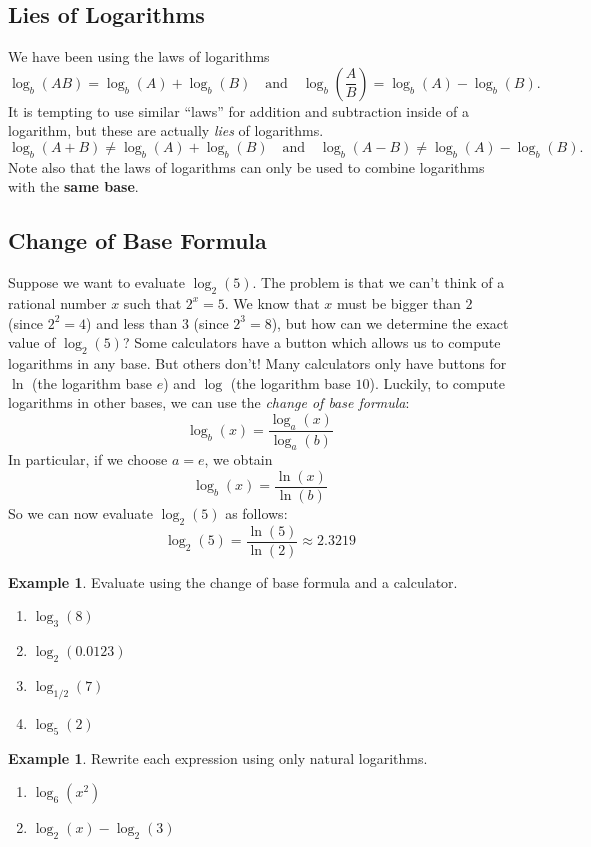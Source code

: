 \documentclass[letterpaper,12pt,oneside]{book}
\theoremstyle{definition}
\newtheorem{example}[theorem]{Example}
\begin{document}
{\subsection*{Lies of Logarithms}

We have been using the laws of logarithms
\[
\log_b(AB)=\log_b(A)+\log_b(B) \ \ \ \mbox{ and } \ \ \ \log_b\left(\frac{A}{B}\right)=\log_b(A)-\log_b(B).
\]
It is tempting to use similar ``laws'' for addition and subtraction inside of a logarithm, but these are actually \emph{lies} of logarithms.
\[
\log_b(A+B)\neq \log_b(A)+\log_b(B) \ \ \ \mbox{ and } \ \ \ \log_b(A-B)\neq \log_b(A)-\log_b(B).
\]
Note also that the laws of logarithms can only be used to combine logarithms with the \textbf{same base}.

\subsection*{Change of Base Formula}

Suppose we want to evaluate $\log_2(5)$.  The problem is that we can't think of a rational number $x$ such that $2^x=5$.  We know that $x$ must be bigger than $2$ (since $2^2=4$) and less than $3$ (since $2^3=8$), but how can we determine the exact value of $\log_2(5)$?  Some calculators have a button which allows us to compute logarithms in any base.  But others don't!  Many calculators only have buttons for $\ln$ (the logarithm base $e$) and $\log$ (the logarithm base $10$).  Luckily, to compute logarithms in other bases, we can use the \emph{change of base formula}:
\[
\log_b(x)=\frac{\log_a(x)}{\log_a(b)}
\] 
In particular, if we choose $a=e$, we obtain
\[
\log_b(x)=\frac{\ln(x)}{\ln(b)}
\]
So we can now evaluate $\log_2(5)$ as follows:
\[
\log_2(5)=\frac{\ln(5)}{\ln(2)}\approx 2.3219
\]

\begin{example}
Evaluate using the change of base formula and a calculator.
\begin{enumerate}
\item $\log_3(8)$
\vfill
\item $\log_2\left(0.0123\right)$
\vfill
\item $\log_{1/2}(7)$
\vfill
\item $\log_5(2)$
\vfill
\end{enumerate}
\end{example}

\begin{example}
Rewrite each expression using only natural logarithms.
\begin{enumerate}
\item $\log_6(x^2)$
\vfill
\item $\log_2(x)-\log_2(3)$
\vfill
\end{enumerate}
\end{example}

}
\end{document}
